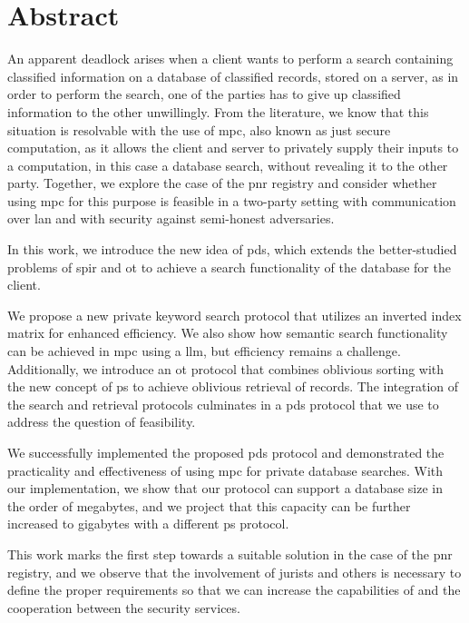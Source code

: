 \chapter*{Abstract}


An apparent deadlock arises when a client wants to perform a search containing classified information on a database of classified records, stored on a server, as in order to perform the search, one of the parties has to give up classified information to the other unwillingly. From the literature, we know that this situation is resolvable with the use of \acrfull{mpc}, also known as just secure computation, as it allows the client and server to privately supply their inputs to a computation, in this case a database search, without revealing it to the other party. Together, we explore the case of the \acrfull{pnr} registry and consider whether using \acrshort{mpc} for this purpose is feasible in a two-party setting with communication over \acrfull{lan} and with security against semi-honest adversaries.

In this work, we introduce the new idea of \acrfull{pds}, which extends the better-studied problems of \acrfull{spir} and \acrfull{ot} to achieve a search functionality of the database for the client. 

We propose a new private keyword search protocol that utilizes an inverted index matrix for enhanced efficiency. We also show how semantic search functionality can be achieved in \acrshort{mpc} using a \acrfull{llm}, but efficiency remains a challenge. Additionally, we introduce an \acrshort{ot} protocol that combines oblivious sorting with the new concept of \acrfull{ps} to achieve oblivious retrieval of records. The integration of the search and retrieval protocols culminates in a \acrshort{pds} protocol that we use to address the question of feasibility.

We successfully implemented the proposed \acrshort{pds} protocol and demonstrated the practicality and effectiveness of using \acrshort{mpc} for private database searches. With our implementation, we show that our protocol can support a database size in the order of megabytes, and we project that this capacity can be further increased to gigabytes with a different \acrshort{ps} protocol. 

This work marks the first step towards a suitable solution in the case of the \acrshort{pnr} registry, and we observe that the involvement of jurists and others is necessary to define the proper requirements so that we can increase the capabilities of and the cooperation between the security services.
